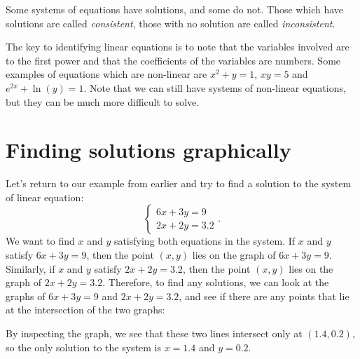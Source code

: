 \documentclass[nooutcomes]{ximera}
\begin{document}
Some systems of equations have solutions, and some do not. Those which have solutions are called \emph{consistent}, those with no solution are called \emph{inconsistent}.

The key to identifying linear equations is to note that the variables involved are to the first power and that the coefficients of the variables are numbers. Some examples of equations which are non-linear are $x^2+y = 1$, $xy = 5$ and $e^{2x} + \ln(y) = 1$. Note that we can still have systems of non-linear equations, but they can be much more difficult to solve. 

\section{Finding solutions graphically}
Let's return to our example from earlier and try to find a solution to the system of linear equation:
$$
\begin{cases}
6x + 3y = 9 \\
2x + 2y = 3.2
\end{cases}.
$$
We want to find $x$ and $y$ satisfying both equations in the system. If $x$ and $y$ satisfy $6x + 3y = 9$, then the point $(x, y)$ lies on the graph of $6x + 3y = 9$. Similarly, if $x$ and $y$ satisfy $2x + 2y = 3.2$, then the point $(x, y)$ lies on the graph of $2x + 2y = 3.2$. Therefore, to find any solutions, we can look at the graphs of $6x + 3y = 9$ and $2x + 2y = 3.2$, and see if there are any points that lie at the intersection of the two graphs:

\begin{image}
\end{image}

By inspecting the graph, we see that these two lines intersect only at $(1.4, 0.2)$, so the only solution to the system is $x = 1.4$ and $y = 0.2$. 
\end{document}
